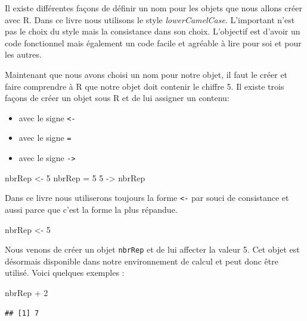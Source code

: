 \documentclass[twoside,symmetric]{book}
\newenvironment{Shaded}{}{}
\newcommand{\DecValTok}[1]{#1}
\newcommand{\NormalTok}[1]{#1}
\newcommand{\OperatorTok}[1]{#1}
\newcommand{\StringTok}[1]{#1}
\providecommand{\tightlist}{%
  \setlength{\itemsep}{0pt}\setlength{\parskip}{0pt}}
\begin{document}
Il existe différentes façons de définir un nom pour les objets que nous allons créer avec R. Dans ce livre nous utilisons le style \emph{lowerCamelCase}. L'important n'est pas le choix du style mais la consistance dans son choix. L'objectif est d'avoir un code fonctionnel mais également un code facile et agréable à lire pour soi et pour les autres.

Maintenant que nous avons choisi un nom pour notre objet, il faut le créer et faire comprendre à R que notre objet doit contenir le chiffre 5. Il existe trois façons de créer un objet sous R et de lui assigner un contenu:

\begin{itemize}
\tightlist
\item
  avec le signe \texttt{\textless{}-}
\item
  avec le signe \texttt{=}
\item
  avec le signe \texttt{-\textgreater{}}
\end{itemize}

\begin{Shaded}
\begin{Highlighting}[]
\NormalTok{nbrRep <-}\StringTok{ }\DecValTok{5}
\NormalTok{nbrRep =}\StringTok{ }\DecValTok{5}
\DecValTok{5}\NormalTok{ ->}\StringTok{ }\NormalTok{nbrRep}
\end{Highlighting}
\end{Shaded}

Dans ce livre nous utiliserons toujours la forme \texttt{\textless{}-} par souci de consistance et aussi parce que c'est la forme la plus répandue.

\begin{Shaded}
\begin{Highlighting}[]
\NormalTok{nbrRep <-}\StringTok{ }\DecValTok{5}
\end{Highlighting}
\end{Shaded}

Nous venons de créer un objet \texttt{nbrRep} et de lui affecter la valeur 5. Cet objet est désormais disponible dans notre environnement de calcul et peut donc être utilisé. Voici quelques exemples :

\begin{Shaded}
\begin{Highlighting}[]
\NormalTok{nbrRep }\OperatorTok{+}\StringTok{ }\DecValTok{2}
\end{Highlighting}
\end{Shaded}

\begin{verbatim}
## [1] 7
\end{verbatim}
\end{document}
